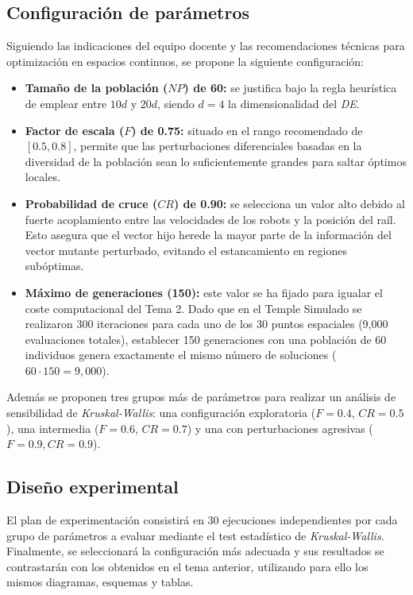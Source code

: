 
\subsection*{Configuración de parámetros}
Siguiendo las indicaciones del equipo docente y las recomendaciones técnicas para optimización en espacios continuos, se propone la siguiente configuración:

\begin{itemize}
    \item \textbf{Tamaño de la población ($NP$) de 60:} se justifica bajo la regla 
heurística de emplear entre $10d$ y $20d$, siendo $d = 4$ la dimensionalidad del \textit{DE}.

    \item \textbf{Factor de escala ($F$) de 0.75:} situado en el rango recomendado de 
$[0.5, 0.8]$, permite que las perturbaciones diferenciales basadas en la 
diversidad de la población sean lo suficientemente grandes para saltar óptimos locales.

    \item \textbf{Probabilidad de cruce ($CR$) de 0.90:} se selecciona un valor alto 
debido al fuerte acoplamiento entre las velocidades de los robots y la posición del raíl. 
Esto asegura que el vector hijo herede la mayor parte de la información del vector mutante
perturbado, evitando el estancamiento en regiones subóptimas.

    \item \textbf{Máximo de generaciones (150):} este valor se ha fijado para igualar 
el coste computacional del Tema 2. Dado que en el Temple Simulado se realizaron 300 
iteraciones para cada uno de los 30 puntos espaciales (9,000 evaluaciones totales), 
establecer 150 generaciones con una población de 60 individuos genera exactamente el mismo 
número de soluciones ($60 \cdot 150 = 9,000$).
\end{itemize}

Además se proponen tres grupos más de parámetros para realizar un análisis de 
sensibilidad de \textit{Kruskal-Wallis}: una configuración exploratoria
($F=0.4$, $CR=0.5$), una intermedia ($F=0.6$, $CR=0.7$) y una con perturbaciones agresivas ($F=0.9,CR=0.9$).

\subsection*{Diseño experimental}
El plan de experimentación consistirá en 30 ejecuciones independientes por 
cada grupo de parámetros a evaluar mediante el test estadístico de \textit{Kruskal-Wallis}. 
Finalmente, se 
seleccionará la configuración más adecuada y sus resultados se contrastarán
con los obtenidos en el tema anterior, utilizando para ello los mismos diagramas, esquemas y 
tablas. 